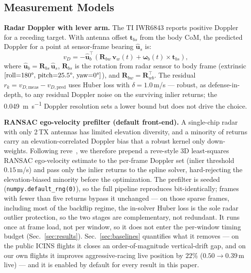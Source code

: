 \documentclass[conference]{IEEEtran}
\newcommand{\vR}{\mathbf{R}}
\newcommand{\vv}{\mathbf{v}}
\newcommand{\vom}{\boldsymbol{\omega}}
\newcommand{\vu}{\hat{\mathbf{u}}}
\begin{document}
\subsection{Measurement Models}
\label{sec:models}

\textbf{Radar Doppler with lever arm.}
The TI IWR6843 reports positive Doppler for a receding target.
With antenna offset $\mathbf{t}_{bs}$ from the body CoM, the
predicted Doppler for a point at sensor-frame bearing $\vu_s$ is:
\begin{equation}
  v_D = -\vu_b^{\top}\!\left(
    \vR_{bw}\,\vv_w(t) + \vom_b(t) \times \mathbf{t}_{bs}
  \right),
  \label{eq:doppler}
\end{equation}
where $\vu_b = \vR_{bs}\,\vu_s$, $\vR_{bs}$ is the rotation from
radar sensor to body frame (extrinsic $[\text{roll}{=}180\degree,\,
\text{pitch}{=}25.5\degree,\,\text{yaw}{=}0\degree]$), and
$\vR_{bw} = \vR_{wb}^{\top}$.  The residual
$r_k = v_{D,\text{meas}} - v_{D,\text{pred}}$ uses Huber
loss with $\delta = 1.0$\,m/s --- robust, as defense-in-depth, to any
residual Doppler noise on the surviving inlier returns; the
\SI{0.049}{\metre\per\second} Doppler resolution sets a lower bound but
does not drive the choice.

\textbf{RANSAC ego-velocity prefilter (default front-end).}
A single-chip radar with only 2\,TX antennas has limited elevation
diversity, and a minority of returns carry an elevation-correlated
Doppler bias that a robust kernel only down-weights.  Following
reve~\cite{doer2020ekf}, we therefore prepend a reve-style 3D
least-squares RANSAC ego-velocity estimate to the per-frame Doppler set
(inlier threshold $0.15$\,m/s) and pass only the inlier returns to the
spline solver, hard-rejecting the elevation-biased minority before the
optimization.  The prefilter is seeded
(\texttt{numpy.default\_rng(0)}), so the full pipeline reproduces
bit-identically; frames with fewer than five returns bypass it
unchanged --- on those sparse frames, including most of the backflip
regime, the in-solver Huber loss is the sole radar outlier protection,
so the two stages are complementary, not redundant.  It runs once at
frame load, not per window, so it does not
enter the per-window timing budget (Sec.~\ref{sec:results}).
Sec.~\ref{sec:baselines} quantifies what it removes --- on the public
ICINS flights it closes an order-of-magnitude vertical-drift gap, and on
our own flights it improves aggressive-racing live position by $22\%$ ($0.50\to0.39$\,m
live) --- and it is enabled by default for every result in this paper.
\end{document}

